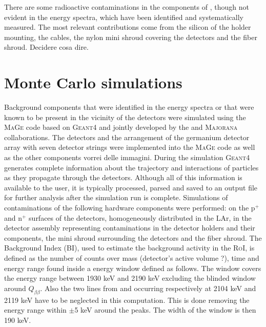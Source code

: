  There are some radioactive contaminations in the components of {\gerda}, though not evident in the energy spectra, which have been identified and systematically measured. The most relevant contributions come from the silicon of the holder mounting, the cables, the nylon mini shroud covering the detectors and the fiber shroud. {\color{red}Decidere cosa dire}.

\section*{Monte Carlo simulations}
Background components that were identified in the energy spectra or that were known to be present in the vicinity of the detectors were simulated using the \textsc{MaGe} \cite{MaGe} code based on \textsc{Geant4} \cite{geant4} and jointly developed by the {\gerda} and \textsc{Majorana} \cite{majoranadem} collaborations. The detectors and the arrangement of the germanium detector array with seven detector strings were implemented into the \textsc{MaGe} code as well as the other {\gerda} components {\color{red}vorrei delle immagini}. During the simulation \textsc{Geant4} generates complete information about the trajectory and interactions of particles as they propagate through the detectors. Although all of this information is available to the user, it is typically processed, parsed and saved to an output file for further analysis after the simulation run is complete. Simulations of contaminations of the following hardware components were performed: on the p$^+$ and n$^+$ surfaces of the detectors, homogeneously distributed in the LAr, in the detector assembly representing contaminations in the detector holders and their components, the mini shroud surrounding the detectors and the fiber shroud.
 The Background Index (BI), used to estimate the background activity in the \textsc{RoI}, is defined as the number of counts over mass (detector's active volume {\color{red}?}), time and energy range found inside a energy window defined as follows. The window covers the energy range between 1930 keV and 2190 keV excluding the blinded window around $Q_{\beta\beta}$. Also the two lines from  and  occurring respectively at 2104 keV and 2119 keV have to be neglected in this computation. This is done removing the energy range within $\pm$5 keV around the peaks. The width of the window is then 190 keV.

